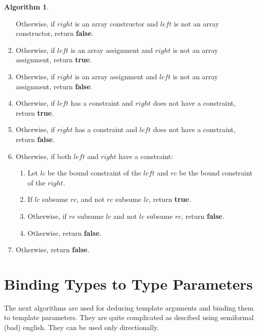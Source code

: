\documentclass[a4paper,oneside,11pt]{book}
\theoremstyle{definition}
\newtheorem{algo}{Algorithm}[section]
\begin{document}
\begin{algo}
\begin{enumerate}
Otherwise, if $right$ is an array constructor and $left$ is not an array constructor, return \textbf{false}.
\item
Otherwise, if $left$ is an array assignment and $right$ is not an array assignment, return \textbf{true}.
\item
Otherwise, if $right$ is an array assignment and $left$ is not an array assignment, return \textbf{false}.
\item
Otherwise, if $left$ has a constraint and $right$ does not have a constraint, return \textbf{true}.
\item
Otherwise, if $right$ has a constraint and $left$ does not have a constraint, return \textbf{false}.
\item
Otherwise, if both $left$ and $right$ have a constraint:
\begin{enumerate}
\item
Let $lc$ be the bound constraint of the $left$ and $rc$ be the bound constraint of the $right$.
\item
If $lc$ subsume $rc$, and not $rc$ subsume $lc$, return \textbf{true}.
\item
Otherwise, if $rc$ subsume $lc$ and not $lc$ subsume $rc$, return \textbf{false}.
\item
Otherwise, return \textbf{false}.
\end{enumerate}
\item
Otherwise, return \textbf{false}.
\end{enumerate}
\end{algo}

\section{Binding Types to Type Parameters}

The next algorithms are used for deducing template arguments and binding them to template parameters.
They are quite complicated as descibed using semiformal (bad) english. They can be used only directionally.
\end{document}

